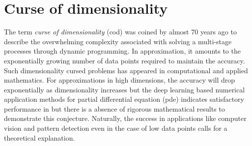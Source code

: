 





\chapter{Curse of dimensionality}

The term \textit{curse of dimensionality} (\gls{cod}) was coined by
\cite{bellmanTheoryDynamicProgramming1952} almost 70 years ago to describe the
overwhelming complexity associated with solving a multi-stage processes through
dynamic programming. In approximation, it amounts to the exponentially growing
number of data points required to maintain the accuracy. Such dimensionality
cursed problems has appeared in computational and applied mathematics. For
approximations in high dimensions, the accuracy will drop exponentially as
dimensionality increases but the deep learning based numerical application
methods for partial differential equation (\gls{pde}) indicates satisfactory
performance in \cite{eDeepRitzMethod2017,
eDeepLearningbasedNumerical2017,beckMachineLearningApproximation2019} but there
is a absence of rigorous mathematical results to demonstrate this conjecture.
Naturally, the success in applications like computer vision and pattern
detection even in the case of low data points calls for a theoretical
explanation.
 

